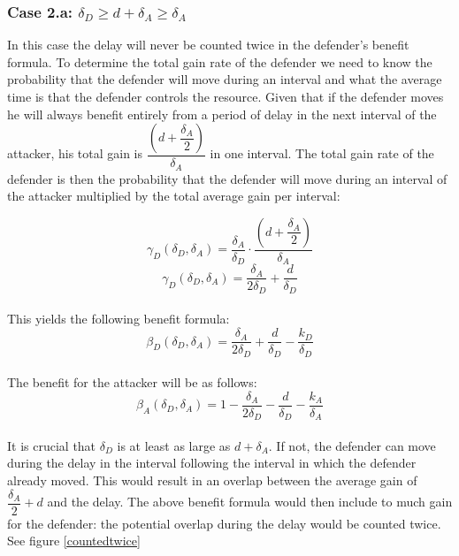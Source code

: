 \subsubsection*{\textbf{Case 2.a:} $ \delta_{D} \geq d + \delta_{A} \geq \delta_{A}$}
In this case the delay will never be counted twice in the defender's  benefit formula. To determine the total gain rate of the defender we need to know the probability that the defender will move during an interval and what the average time is that the defender controls the resource. Given that if the defender moves he will always benefit entirely from a period of delay in the next interval of the attacker, his total gain is $\dfrac{(d+\dfrac{\delta_{A}}{2})}{\delta_{A}}$  in one interval. The total gain  rate of the defender is then the probability that the defender will move during an interval of the attacker multiplied by the total average gain per interval: 

\begin{equation*}\label{first}
\gamma_{D}(\delta_{D},\delta_{A}) = \dfrac{\delta_{A}}{\delta_{D}} \cdot \dfrac{(d+\dfrac{\delta_{A}}{2})}{\delta_{A}} 
\end{equation*}
\begin{equation*}\label{first}
\gamma_{D}(\delta_{D},\delta_{A}) = \dfrac{\delta_{A}}{2\delta_{D}} + \dfrac{d}{\delta_{D}} 
\end{equation*}\\
This yields the following benefit formula:
\begin{equation}\label{benfcase2a:defender}
\beta_{D}(\delta_{D},\delta_{A}) = \dfrac{\delta_{A}}{2\delta_{D}} + \dfrac{d}{\delta_{D}} - \dfrac{k_{D}}{ \delta_{D}}
\end{equation}\\

The benefit for the attacker will be as follows:
\begin{equation}\label{benfcase2a:attacker}
\beta_{A}(\delta_{D},\delta_{A}) = 1 -\dfrac{\delta_{A}}{2\delta_{D}} - \dfrac{d}{\delta_{D}} - \dfrac{k_{A}}{ \delta_{A}}
\end{equation}\\



It is crucial that $ \delta_{D}$ is at least as large as $d + \delta_{A}$. If not, the defender can move during the delay in the interval following the interval in which the defender already moved. This would result in an overlap between the average gain of $\dfrac{\delta_{A}}{2} +d$ and the delay. The above benefit formula would then include to much gain for the defender: the potential overlap during the delay would be counted twice. See figure \ref{countedtwice}\\

